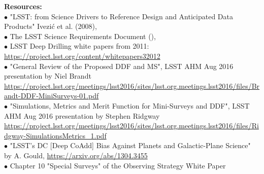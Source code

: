 \documentclass[DM,lsstdraft,toc]{lsstdoc}
\begin{document}
\noindent \textbf{Resources:} \\
$\bullet$ "LSST: from Science Drivers to Reference Design and Anticipated Data Products" Ivezi\'{c} et al. (2008), \citep{2008arXiv0805.2366I} \\
$\bullet$ The LSST Science Requirements Document (\SRD),  \\
$\bullet$ LSST Deep Drilling white papers from 2011: \url{https://project.lsst.org/content/whitepapers32012} \\
$\bullet$ "General Review of the Proposed DDF and MS", LSST AHM Aug 2016 presentation by Niel Brandt \url{https://project.lsst.org/meetings/lsst2016/sites/lsst.org.meetings.lsst2016/files/Brandt-DDF-MiniSurveys-01.pdf} \\
$\bullet$ "Simulations, Metrics and Merit Function for Mini-Surveys and DDF", LSST AHM Aug 2016 presentation by Stephen Ridgway \url{https://project.lsst.org/meetings/lsst2016/sites/lsst.org.meetings.lsst2016/files/Ridgway-SimulationsMetrics_1.pdf} \\
$\bullet$ "LSST's DC [Deep CoAdd] Bias Against Planets and Galactic-Plane Science" by A. Gould, \citep{2013arXiv1304.3455G} \url{https://arxiv.org/abs/1304.3455} \\
$\bullet$ Chapter 10 "Special Surveys" of the Observing Strategy White Paper \citep{2017arXiv170804058L}
\end{document}
